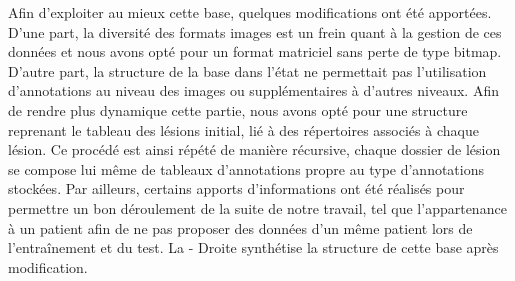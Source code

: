 Afin d'exploiter au mieux cette base, quelques modifications ont été apportées. D'une part, la diversité des formats images est un frein quant à la gestion de ces données et nous avons opté pour un format matriciel sans perte de type bitmap. D'autre part, la structure de la base dans l'état ne permettait pas l'utilisation d'annotations au niveau des images ou supplémentaires à d'autres niveaux. Afin de rendre plus dynamique cette partie, nous avons opté pour une structure reprenant le tableau des lésions initial, lié à des répertoires associés à chaque lésion. Ce procédé est ainsi répété de manière récursive, chaque dossier de lésion se compose lui même de tableaux d'annotations propre au type d'annotations stockées. Par ailleurs, certains apports d'informations ont été réalisés pour permettre un bon déroulement de la suite de notre travail, tel que l'appartenance à un patient afin de ne pas proposer des données d'un même patient lors de l'entraînement et du test. La  - Droite synthétise la structure de cette base après modification.\par

